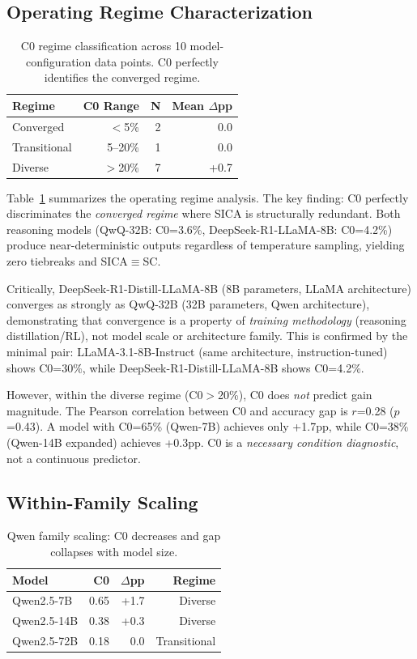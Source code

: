 \documentclass[11pt,a4paper]{article}
\begin{document}
\subsection{Operating Regime Characterization}

\begin{table}[t]
\centering
\small
\caption{C0 regime classification across 10 model-configuration data points. C0 perfectly identifies the converged regime.}
\label{tab:regime}
\begin{tabular}{lrrr}
\toprule
\textbf{Regime} & \textbf{C0 Range} & \textbf{N} & \textbf{Mean $\Delta$pp} \\
\midrule
Converged & $<$5\% & 2 & 0.0 \\
Transitional & 5--20\% & 1 & 0.0 \\
Diverse & $>$20\% & 7 & +0.7 \\
\bottomrule
\end{tabular}
\end{table}

Table~\ref{tab:regime} summarizes the operating regime analysis. The key finding: C0 perfectly discriminates the \emph{converged regime} where SICA is structurally redundant. Both reasoning models (QwQ-32B: C0=3.6\%, DeepSeek-R1-LLaMA-8B: C0=4.2\%) produce near-deterministic outputs regardless of temperature sampling, yielding zero tiebreaks and SICA$\equiv$SC.

Critically, DeepSeek-R1-Distill-LLaMA-8B (8B parameters, LLaMA architecture) converges as strongly as QwQ-32B (32B parameters, Qwen architecture), demonstrating that convergence is a property of \emph{training methodology} (reasoning distillation/RL), not model scale or architecture family. This is confirmed by the minimal pair: LLaMA-3.1-8B-Instruct (same architecture, instruction-tuned) shows C0=30\%, while DeepSeek-R1-Distill-LLaMA-8B shows C0=4.2\%.

However, within the diverse regime (C0$>$20\%), C0 does \emph{not} predict gain magnitude. The Pearson correlation between C0 and accuracy gap is $r$=0.28 ($p$=0.43). A model with C0=65\% (Qwen-7B) achieves only +1.7pp, while C0=38\% (Qwen-14B expanded) achieves +0.3pp. C0 is a \emph{necessary condition diagnostic}, not a continuous predictor.

\subsection{Within-Family Scaling}

\begin{table}[t]
\centering
\small
\caption{Qwen family scaling: C0 decreases and gap collapses with model size.}
\label{tab:scaling}
\begin{tabular}{lrrr}
\toprule
\textbf{Model} & \textbf{C0} & \textbf{$\Delta$pp} & \textbf{Regime} \\
\midrule
Qwen2.5-7B & 0.65 & +1.7 & Diverse \\
Qwen2.5-14B & 0.38 & +0.3 & Diverse \\
Qwen2.5-72B & 0.18 & 0.0 & Transitional \\
\bottomrule
\end{tabular}
\end{table}
\end{document}
